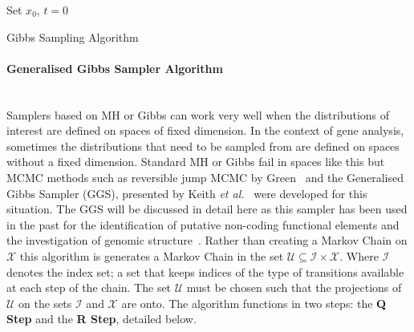 \begin{algorithm}[H]
 Set $x_0$, $t=0$\; 
  \caption{Gibbs Sampling Algorithm}
\end{algorithm}

	\paragraph{Generalised Gibbs Sampler Algorithm}~\\
\noindent
Samplers based on MH or Gibbs can work very well when the distributions of interest are defined on spaces of fixed dimension. In the context of gene analysis, sometimes the distributions that need to be sampled from are defined on spaces without a fixed dimension. Standard MH or Gibbs fail in spaces like this but MCMC methods such as reversible jump MCMC by Green~\cite{green1995reversible} and the Generalised Gibbs Sampler (GGS), presented by Keith \emph{et al.}~\cite{keith2004generalized} were developed for this situation. The GGS will be discussed in detail here as this sampler has been used in the past for the identification of putative non-coding functional elements and the investigation of genomic structure~\cite{algama2014drosophila}.%
Rather than creating a Markov Chain on ${\mathscr X}$ this algorithm is generates a Markov Chain in the set $\mathscr U \subseteq \mathscr I \times \mathscr X$. Where $\mathscr I$ denotes the index set; a set that keeps indices of the type of transitions available at each step of the chain. The set $\mathscr U$ must be chosen such that the projections of $\mathscr U$ on the sets $\mathscr I$ and $\mathscr X$ are onto. The algorithm functions in two steps: the \textbf{Q Step} and the \textbf{R Step}, detailed below. 

